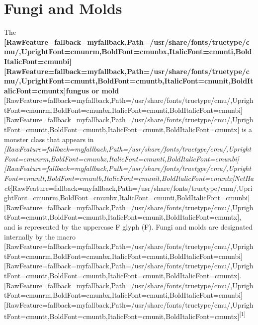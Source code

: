 \chapter{Fungi and Molds}
The {\bfseries \allowbreak{}\setmainfont{cmunbx.ttf}[RawFeature={fallback=myfallback},Path=/usr/share/fonts/truetype/cmu/,UprightFont=cmunrm,BoldFont=cmunbx,ItalicFont=cmunti,BoldItalicFont=cmunbi]\setmonofont{cmunbx.ttf}[RawFeature={fallback=myfallback},Path=/usr/share/fonts/truetype/cmu/,UprightFont=cmuntt,BoldFont=cmuntb,ItalicFont=cmunit,BoldItalicFont=cmuntx]\bfseries fungus or mold}{$\text{ }$}\allowbreak{}\setmainfont{cmunrm.ttf}[RawFeature={fallback=myfallback},Path=/usr/share/fonts/truetype/cmu/,UprightFont=cmunrm,BoldFont=cmunbx,ItalicFont=cmunti,BoldItalicFont=cmunbi]\setmonofont{cmunrm.ttf}[RawFeature={fallback=myfallback},Path=/usr/share/fonts/truetype/cmu/,UprightFont=cmuntt,BoldFont=cmuntb,ItalicFont=cmunit,BoldItalicFont=cmuntx] is a monster class\footnotemark[1] that appears in {\itshape \allowbreak{}\setmainfont{cmunti.ttf}[RawFeature={fallback=myfallback},Path=/usr/share/fonts/truetype/cmu/,UprightFont=cmunrm,BoldFont=cmunbx,ItalicFont=cmunti,BoldItalicFont=cmunbi]\setmonofont{cmunti.ttf}[RawFeature={fallback=myfallback},Path=/usr/share/fonts/truetype/cmu/,UprightFont=cmuntt,BoldFont=cmuntb,ItalicFont=cmunit,BoldItalicFont=cmuntx]\itshape NetHack\footnotemark[2]}\allowbreak{}\setmainfont{cmunrm.ttf}[RawFeature={fallback=myfallback},Path=/usr/share/fonts/truetype/cmu/,UprightFont=cmunrm,BoldFont=cmunbx,ItalicFont=cmunti,BoldItalicFont=cmunbi]\setmonofont{cmunrm.ttf}[RawFeature={fallback=myfallback},Path=/usr/share/fonts/truetype/cmu/,UprightFont=cmuntt,BoldFont=cmuntb,ItalicFont=cmunit,BoldItalicFont=cmuntx], and is represented by the uppercase F\footnotemark[3] glyph (F). Fungi and molds are designated internally by the macro {}\allowbreak{}\setmainfont{cmunrm.ttf}[RawFeature={fallback=myfallback},Path=/usr/share/fonts/truetype/cmu/,UprightFont=cmunrm,BoldFont=cmunbx,ItalicFont=cmunti,BoldItalicFont=cmunbi]\setmonofont{cmunrm.ttf}[RawFeature={fallback=myfallback},Path=/usr/share/fonts/truetype/cmu/,UprightFont=cmuntt,BoldFont=cmuntb,ItalicFont=cmunit,BoldItalicFont=cmuntx].\allowbreak{}\setmainfont{cmunrm.ttf}[RawFeature={fallback=myfallback},Path=/usr/share/fonts/truetype/cmu/,UprightFont=cmunrm,BoldFont=cmunbx,ItalicFont=cmunti,BoldItalicFont=cmunbi]\setmonofont{cmunrm.ttf}[RawFeature={fallback=myfallback},Path=/usr/share/fonts/truetype/cmu/,UprightFont=cmuntt,BoldFont=cmuntb,ItalicFont=cmunit,BoldItalicFont=cmuntx]\textsuperscript{{$\text{[}$}1{$\text{]}$}}


